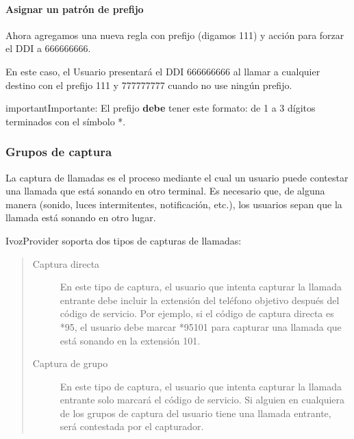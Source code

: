 \documentclass[letterpaper,10pt,spanish]{sphinxmanual}
\begin{document}
\paragraph{Asignar un patrón de prefijo}

Ahora agregamos una nueva regla con prefijo (digamos 111) y acción para forzar el DDI a 666666666.

En este caso, el Usuario presentará el DDI 666666666 al llamar a cualquier destino con el prefijo 111 y 777777777 cuando no use ningún prefijo.

\begin{notice}{important}{Importante:}
El prefijo \textbf{debe} tener este formato: de 1 a 3 dígitos terminados con el símbolo *.
\end{notice}


\subsubsection{Grupos de captura}
\label{administration_portal/client/vpbx/user_configuration/pick_up_groups:capture-groups}\label{administration_portal/client/vpbx/user_configuration/pick_up_groups:pick-up-groups}\label{administration_portal/client/vpbx/user_configuration/pick_up_groups::doc}
La captura de llamadas es el proceso mediante el cual un usuario puede contestar una llamada que está sonando en otro terminal. Es necesario que, de alguna manera (sonido, luces intermitentes, notificación, etc.), los usuarios sepan que la llamada está sonando en otro lugar.

IvozProvider soporta dos tipos de capturas de llamadas:
\begin{quote}
\begin{description}
\item[{Captura directa}] \leavevmode
En este tipo de captura, el usuario que intenta capturar la llamada entrante debe incluir la extensión del teléfono objetivo después del código de servicio. Por ejemplo, si el código de captura directa es *95, el usuario debe marcar *95101 para capturar una llamada que está sonando en la extensión 101.

\item[{Captura de grupo}] \leavevmode
En este tipo de captura, el usuario que intenta capturar la llamada entrante solo marcará el código de servicio. Si alguien en cualquiera de los grupos de captura del usuario tiene una llamada entrante, será contestada por el capturador.

\end{description}
\end{quote}
\end{document}

